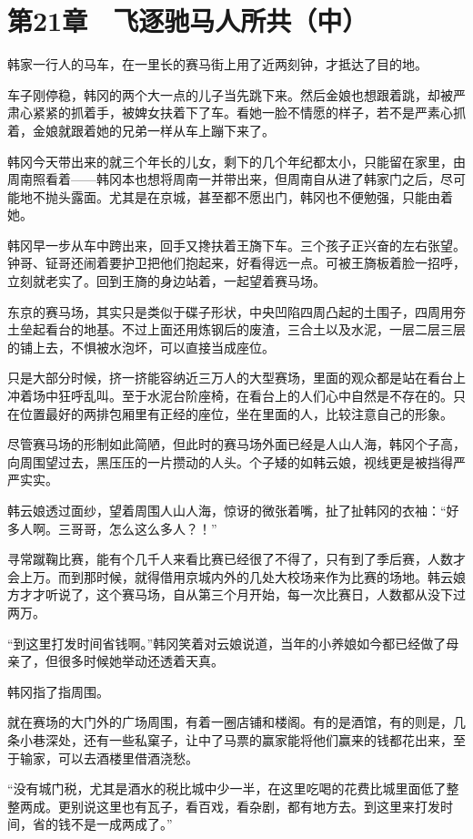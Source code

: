 \section{第21章　飞逐驰马人所共（中）}

韩家一行人的马车，在一里长的赛马街上用了近两刻钟，才抵达了目的地。

车子刚停稳，韩冈的两个大一点的儿子当先跳下来。然后金娘也想跟着跳，却被严肃心紧紧的抓着手，被婢女扶着下了车。看她一脸不情愿的样子，若不是严素心抓着，金娘就跟着她的兄弟一样从车上蹦下来了。

韩冈今天带出来的就三个年长的儿女，剩下的几个年纪都太小，只能留在家里，由周南照看着——韩冈本也想将周南一并带出来，但周南自从进了韩家门之后，尽可能地不抛头露面。尤其是在京城，甚至都不愿出门，韩冈也不便勉强，只能由着她。

韩冈早一步从车中跨出来，回手又搀扶着王旖下车。三个孩子正兴奋的左右张望。钟哥、钲哥还闹着要护卫把他们抱起来，好看得远一点。可被王旖板着脸一招呼，立刻就老实了。回到王旖的身边站着，一起望着赛马场。

东京的赛马场，其实只是类似于碟子形状，中央凹陷四周凸起的土围子，四周用夯土垒起看台的地基。不过上面还用炼钢后的废渣，三合土以及水泥，一层二层三层的铺上去，不惧被水泡坏，可以直接当成座位。

只是大部分时候，挤一挤能容纳近三万人的大型赛场，里面的观众都是站在看台上冲着场中狂呼乱叫。至于水泥台阶座椅，在看台上的人们心中自然是不存在的。只在位置最好的两排包厢里有正经的座位，坐在里面的人，比较注意自己的形象。

尽管赛马场的形制如此简陋，但此时的赛马场外面已经是人山人海，韩冈个子高，向周围望过去，黑压压的一片攒动的人头。个子矮的如韩云娘，视线更是被挡得严严实实。

韩云娘透过面纱，望着周围人山人海，惊讶的微张着嘴，扯了扯韩冈的衣袖：“好多人啊。三哥哥，怎么这么多人？！”

寻常蹴鞠比赛，能有个几千人来看比赛已经很了不得了，只有到了季后赛，人数才会上万。而到那时候，就得借用京城内外的几处大校场来作为比赛的场地。韩云娘方才才听说了，这个赛马场，自从第三个月开始，每一次比赛日，人数都从没下过两万。

“到这里打发时间省钱啊。”韩冈笑着对云娘说道，当年的小养娘如今都已经做了母亲了，但很多时候她举动还透着天真。

韩冈指了指周围。

就在赛场的大门外的广场周围，有着一圈店铺和楼阁。有的是酒馆，有的则是，几条小巷深处，还有一些私窠子，让中了马票的赢家能将他们赢来的钱都花出来，至于输家，可以去酒楼里借酒浇愁。

“没有城门税，尤其是酒水的税比城中少一半，在这里吃喝的花费比城里面低了整整两成。更别说这里也有瓦子，看百戏，看杂剧，都有地方去。到这里来打发时间，省的钱不是一成两成了。”

